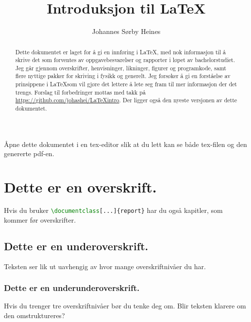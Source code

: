 \title{Introduksjon til \LaTeX} %
\author{Johannes Sørby Heines} %




\maketitle  %

\begin{abstract} %
	Dette dokumentet er laget for å gi en innføring i \LaTeX, med nok informasjon til å skrive
	det som forventes av oppgavebesvarelser og rapporter i løpet av bachelorstudiet.
	Jeg går gjennom overskrifter, henvisninger, likninger, figurer og programkode,
	samt flere nyttige pakker for skriving i fysikk og generelt.
	Jeg forsøker å gi en forståelse av prinsippene i \LaTeX som vil gjøre det lettere å lete
	seg fram til mer informasjon der det trengs.
	Forslag til forbedringer mottas med takk på \url{https://github.com/johashei/LaTeXintro}.
	Der ligger også den nyeste versjonen av dette dokumentet.
\end{abstract}


Åpne dette dokumentet i en tex-editor slik at du lett kan se både tex-filen og den
genererte pdf-en.

\section{Dette er en overskrift.}
Hvis du bruker \lstinline[language=tex, basicstyle=\ttfamily]$\documentclass[...]{report}$
har du også kapitler, som kommer før overskrifter.

\subsection{Dette er en underoverskrift.}
Teksten ser lik ut uavhengig av hvor mange overskriftnivåer du har.

\subsubsection{Dette er en underunderoverskrift.}
Hvis du trenger tre overskriftnivåer bør du tenke deg om. Blir teksten klarere
om den omstruktureres?

